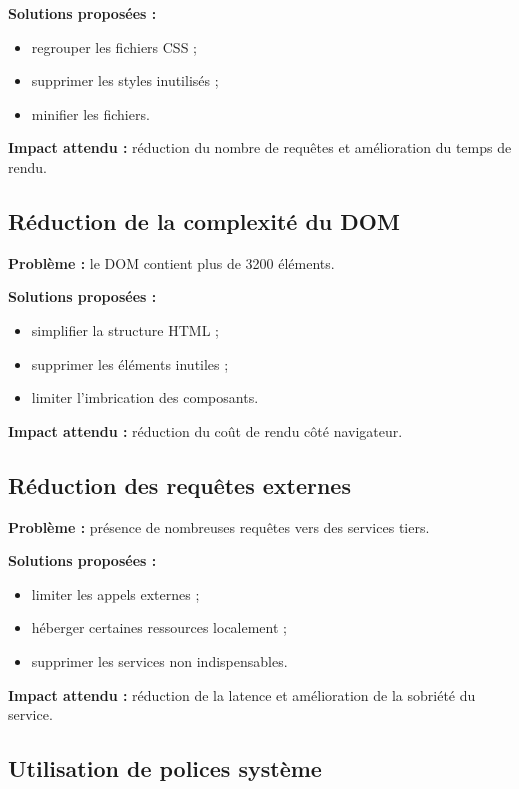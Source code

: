 \documentclass[11pt,a4paper]{article}
\begin{document}
\textbf{Solutions proposées :}
\begin{itemize}
\item regrouper les fichiers CSS ;
\item supprimer les styles inutilisés ;
\item minifier les fichiers.
\end{itemize}

\textbf{Impact attendu :} réduction du nombre de requêtes et amélioration du temps de rendu.

\subsection{Réduction de la complexité du DOM}

\textbf{Problème :} le DOM contient plus de 3200 éléments.

\textbf{Solutions proposées :}
\begin{itemize}
\item simplifier la structure HTML ;
\item supprimer les éléments inutiles ;
\item limiter l'imbrication des composants.
\end{itemize}

\textbf{Impact attendu :} réduction du coût de rendu côté navigateur.

\subsection{Réduction des requêtes externes}

\textbf{Problème :} présence de nombreuses requêtes vers des services tiers.

\textbf{Solutions proposées :}
\begin{itemize}
\item limiter les appels externes ;
\item héberger certaines ressources localement ;
\item supprimer les services non indispensables.
\end{itemize}

\textbf{Impact attendu :} réduction de la latence et amélioration de la sobriété du service.

\subsection{Utilisation de polices système}
\end{document}
